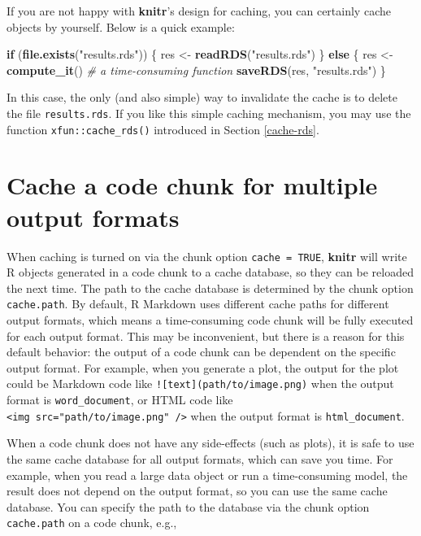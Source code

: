\documentclass[
  11pt,
]{krantz}
\newenvironment{Shaded}{\begin{snugshade}}{\end{snugshade}}
\newcommand{\CommentTok}[1]{\textcolor[rgb]{0.37,0.37,0.37}{\textit{#1}}}
\newcommand{\ControlFlowTok}[1]{\textcolor[rgb]{0.27,0.27,0.27}{\textbf{#1}}}
\newcommand{\KeywordTok}[1]{\textcolor[rgb]{0.27,0.27,0.27}{\textbf{#1}}}
\newcommand{\NormalTok}[1]{#1}
\newcommand{\StringTok}[1]{\textcolor[rgb]{0.5,0.5,0.5}{#1}}
\begin{document}
If you are not happy with \textbf{knitr}'s design for caching, you can certainly cache objects by yourself. Below is a quick example:

\begin{Shaded}
\begin{Highlighting}[]
\ControlFlowTok{if}\NormalTok{ (}\KeywordTok{file.exists}\NormalTok{(}\StringTok{"results.rds"}\NormalTok{)) \{}
\NormalTok{  res <-}\StringTok{ }\KeywordTok{readRDS}\NormalTok{(}\StringTok{"results.rds"}\NormalTok{)}
\NormalTok{\} }\ControlFlowTok{else}\NormalTok{ \{}
\NormalTok{  res <-}\StringTok{ }\KeywordTok{compute_it}\NormalTok{()  }\CommentTok{# a time-consuming function}
  \KeywordTok{saveRDS}\NormalTok{(res, }\StringTok{"results.rds"}\NormalTok{)}
\NormalTok{\}}
\end{Highlighting}
\end{Shaded}

In this case, the only (and also simple) way to invalidate the cache is to delete the file \texttt{results.rds}. If you like this simple caching mechanism, you may use the function \texttt{xfun::cache\_rds()} introduced in Section \ref{cache-rds}.

\hypertarget{cache-path}{%
\section{Cache a code chunk for multiple output formats}\label{cache-path}}

When caching is turned on via the chunk option \texttt{cache\ =\ TRUE}, \textbf{knitr} will write R objects generated in a code chunk to a cache database, so they can be reloaded the next time. The path to the cache database is determined by the chunk option \texttt{cache.path}. By default, R Markdown uses different cache paths for different output formats, which means a time-consuming code chunk will be fully executed for each output format. This may be inconvenient, but there is a reason for this default behavior: the output of a code chunk can be dependent on the specific output format. For example, when you generate a plot, the output for the plot could be Markdown code like \texttt{!{[}text{]}(path/to/image.png)} when the output format is \texttt{word\_document}, or HTML code like \texttt{\textless{}img\ src="path/to/image.png"\ /\textgreater{}} when the output format is \texttt{html\_document}.

When a code chunk does not have any side-effects (such as plots), it is safe to use the same cache database for all output formats, which can save you time. For example, when you read a large data object or run a time-consuming model, the result does not depend on the output format, so you can use the same cache database. You can specify the path to the database via the chunk option \texttt{cache.path} on a code chunk, e.g.,
\end{document}
